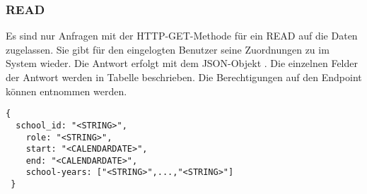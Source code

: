 \subsubsection{READ}
\label{sec:rest:api:user:assingments:read}
Es sind nur Anfragen mit der HTTP-GET-Methode für ein READ auf die Daten zugelassen.
Sie gibt für den eingelogten Benutzer seine Zuordnungen zu im System wieder.
Die Antwort erfolgt mit dem JSON-Objekt . Die einzelnen Felder der Antwort werden in Tabelle  beschrieben.
Die Berechtigungen auf den Endpoint können  entnommen werden.

\begin{lstlisting}[caption={JSON-Antwort für einen GET-Aufruf der Route /api/user/assingments},label={lst:code:rest:api:user:assingments:read:ret},frame=tlrb]
 {
  school_id: "<STRING>",
	role: "<STRING>",
	start: "<CALENDARDATE>",
	end: "<CALENDARDATE>",
	school-years: ["<STRING>",...,"<STRING>"]
 }
\end{lstlisting}
